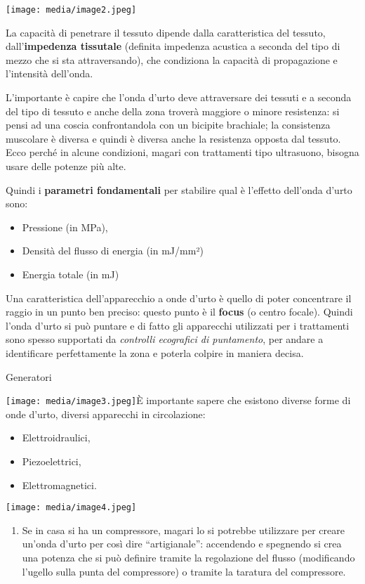 \documentclass[]{article}
\begin{document}
\texttt{[image: media/image2.jpeg]}

La capacità di penetrare il tessuto dipende dalla caratteristica del
tessuto, dall'\textbf{impedenza tissutale} (definita impedenza acustica
a seconda del tipo di mezzo che si sta attraversando), che condiziona la
capacità di propagazione e l'intensità dell'onda.

L'importante è capire che l'onda d'urto deve attraversare dei tessuti e
a seconda del tipo di tessuto e anche della zona troverà maggiore o
minore resistenza: si pensi ad una coscia confrontandola con un bicipite
brachiale; la consistenza muscolare è diversa e quindi è diversa anche
la resistenza opposta dal tessuto. Ecco perché in alcune condizioni,
magari con trattamenti tipo ultrasuono, bisogna usare delle potenze più
alte.

Quindi i \textbf{parametri fondamentali} per stabilire qual è l'effetto
dell'onda d'urto sono:

\begin{itemize}
\item
  Pressione (in MPa),
\item
  Densità del flusso di energia (in mJ/mm²)
\item
  Energia totale (in mJ)
\end{itemize}

Una caratteristica dell'apparecchio a onde d'urto è quello di poter
concentrare il raggio in un punto ben preciso: questo punto è il
\textbf{focus} (o centro focale). Quindi l'onda d'urto si può puntare e
di fatto gli apparecchi utilizzati per i trattamenti sono spesso
supportati da \emph{controlli ecografici di puntamento}, per andare a
identificare perfettamente la zona e poterla colpire in maniera decisa.

Generatori

\texttt{[image: media/image3.jpeg]}È
importante sapere che esistono diverse forme di onde d'urto, diversi
apparecchi in circolazione:

\begin{itemize}
\item
  Elettroidraulici,
\item
  Piezoelettrici,
\item
  Elettromagnetici.
\end{itemize}

\texttt{[image: media/image4.jpeg]}

\begin{enumerate}
\def\labelenumi{\arabic{enumi}.}
\item
  Se in casa si ha un compressore, magari lo si potrebbe utilizzare per
  creare un'onda d'urto per così dire ``artigianale'': accendendo e
  spegnendo si crea una potenza che si può definire tramite la
  regolazione del flusso (modificando l'ugello sulla punta del
  compressore) o tramite la taratura del compressore.
\end{enumerate}
\end{document}
